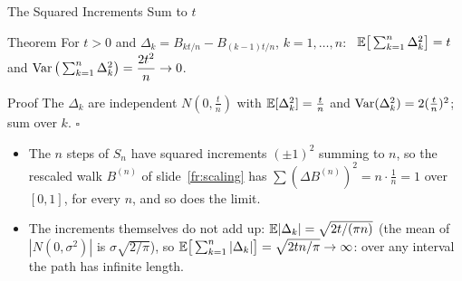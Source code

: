 \begin{frame}{The Squared Increments Sum to $t$}
  \label{fr:bmqv}
  \small
  \begin{block}{Theorem}
    For $t>0$ and $\Delta_k=B_{kt/n}-B_{(k-1)t/n}$, $k=1,\dots,n$:
    \ $\mathbb{E}\big[\sum_{k=1}^n\Delta_k^2\big]=t$ and $\operatorname{Var}\big(\sum_{k=1}^n\Delta_k^2\big)=\dfrac{2t^2}{n}\to0$.
  \end{block}
  \begin{block}{Proof}
    The $\Delta_k$ are independent $N(0,\tfrac tn)$ with $\mathbb{E}[\Delta_k^2]=\tfrac tn$ and $\operatorname{Var}(\Delta_k^2)=2(\tfrac tn)^2$; sum over $k$. \hfill$\square$
  \end{block}
  \begin{itemize}
    \item The $n$ steps of $S_n$ have squared increments $(\pm1)^2$ summing to $n$, so the rescaled walk $B^{(n)}$ of slide~\ref{fr:scaling} has $\sum(\Delta B^{(n)})^2=n\cdot\tfrac1n=1$ over $[0,1]$, for every $n$, and so does the limit.
    \item The increments themselves do not add up: $\mathbb{E}|\Delta_k|=\sqrt{2t/(\pi n)}$ (the mean of $|N(0,\sigma^2)|$ is $\sigma\sqrt{2/\pi}$), so $\mathbb{E}\big[\sum_{k=1}^n|\Delta_k|\big]=\sqrt{2tn/\pi}\to\infty$: over any interval the path has infinite length.
  \end{itemize}
\end{frame}


